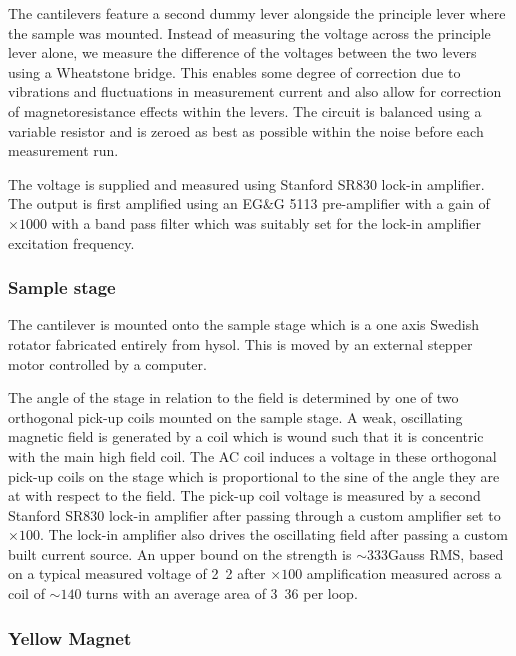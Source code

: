 The cantilevers feature a second dummy lever alongside the principle lever where the sample was mounted. Instead of measuring the voltage across the principle lever alone, we measure the difference of the voltages between the two levers using a Wheatstone bridge. This enables some degree of correction due to vibrations and fluctuations in measurement current and also allow for correction of magnetoresistance effects within the levers. The circuit is balanced using a variable resistor and is zeroed as best as possible within the noise before each measurement run.

The voltage is supplied and measured using Stanford SR830 lock-in amplifier. The output is first amplified using an EG\&G 5113 pre-amplifier with a gain of $\times1000$ with a band pass filter which was suitably set for the lock-in amplifier excitation frequency.

\subsubsection{Sample stage}

The cantilever is mounted onto the sample stage which is a one axis Swedish rotator fabricated entirely from hysol. This is moved by an external stepper motor controlled by a computer. 

The angle of the stage in relation to the field is determined by one of two orthogonal pick-up coils mounted on the sample stage. A weak, oscillating magnetic field is generated by a coil which is wound such that it is concentric with the main high field coil. The AC coil induces a voltage in these orthogonal pick-up coils on the stage which is proportional to the sine of the angle they are at with respect to the field. The pick-up coil voltage is measured by a second Stanford SR830 lock-in amplifier after passing through a custom amplifier set to $\times100$. The lock-in amplifier also drives the oscillating field after passing a custom built current source. An upper bound on the strength is $\sim$\unit{333}{\textrm{Gauss}} RMS, based on a typical measured voltage of \unit{2.2}{\milli\volt} after $\times100$ amplification measured across a coil of $\sim140$ turns with an average area of \unit{3.36}{\milli\metre\squared} per loop.

\subsubsection{Yellow Magnet}

